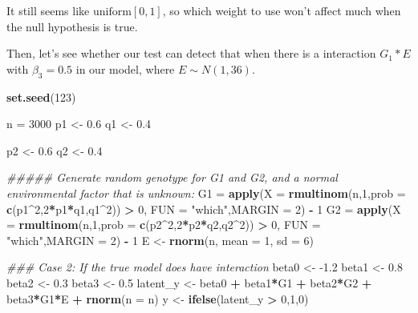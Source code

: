 \documentclass[]{article}
\newenvironment{Shaded}{\begin{snugshade}}{\end{snugshade}}
\newcommand{\CommentTok}[1]{\textcolor[rgb]{0.56,0.35,0.01}{\textit{#1}}}
\newcommand{\DataTypeTok}[1]{\textcolor[rgb]{0.13,0.29,0.53}{#1}}
\newcommand{\DecValTok}[1]{\textcolor[rgb]{0.00,0.00,0.81}{#1}}
\newcommand{\FloatTok}[1]{\textcolor[rgb]{0.00,0.00,0.81}{#1}}
\newcommand{\KeywordTok}[1]{\textcolor[rgb]{0.13,0.29,0.53}{\textbf{#1}}}
\newcommand{\NormalTok}[1]{#1}
\newcommand{\OperatorTok}[1]{\textcolor[rgb]{0.81,0.36,0.00}{\textbf{#1}}}
\newcommand{\StringTok}[1]{\textcolor[rgb]{0.31,0.60,0.02}{#1}}
\begin{document}
It still seems like \(\text{uniform}[0,1]\), so which weight to use
won't affect much when the null hypothesis is true.

Then, let's see whether our test can detect that when there is a
interaction \(G_1*E\) with \(\beta_3 = 0.5\) in our model, where
\(E \sim N(1,36)\).

\begin{Shaded}
\begin{Highlighting}[]
\KeywordTok{set.seed}\NormalTok{(}\DecValTok{123}\NormalTok{)}

\NormalTok{n =}\StringTok{ }\DecValTok{3000}
\NormalTok{p1 <-}\StringTok{ }\FloatTok{0.6}
\NormalTok{q1 <-}\StringTok{ }\FloatTok{0.4}

\NormalTok{p2 <-}\StringTok{ }\FloatTok{0.6}
\NormalTok{q2 <-}\StringTok{ }\FloatTok{0.4}


\CommentTok{##### Generate random genotype for G1 and G2, and a normal environmental factor that is unknown:}
\NormalTok{G1 =}\StringTok{ }\KeywordTok{apply}\NormalTok{(}\DataTypeTok{X =} \KeywordTok{rmultinom}\NormalTok{(n,}\DecValTok{1}\NormalTok{,}\DataTypeTok{prob =} \KeywordTok{c}\NormalTok{(p1}\OperatorTok{^}\DecValTok{2}\NormalTok{,}\DecValTok{2}\OperatorTok{*}\NormalTok{p1}\OperatorTok{*}\NormalTok{q1,q1}\OperatorTok{^}\DecValTok{2}\NormalTok{)) }\OperatorTok{>}\StringTok{ }\DecValTok{0}\NormalTok{, }\DataTypeTok{FUN =} \StringTok{"which"}\NormalTok{,}\DataTypeTok{MARGIN =} \DecValTok{2}\NormalTok{) }\OperatorTok{-}\StringTok{ }\DecValTok{1}
\NormalTok{G2 =}\StringTok{ }\KeywordTok{apply}\NormalTok{(}\DataTypeTok{X =} \KeywordTok{rmultinom}\NormalTok{(n,}\DecValTok{1}\NormalTok{,}\DataTypeTok{prob =} \KeywordTok{c}\NormalTok{(p2}\OperatorTok{^}\DecValTok{2}\NormalTok{,}\DecValTok{2}\OperatorTok{*}\NormalTok{p2}\OperatorTok{*}\NormalTok{q2,q2}\OperatorTok{^}\DecValTok{2}\NormalTok{)) }\OperatorTok{>}\StringTok{ }\DecValTok{0}\NormalTok{, }\DataTypeTok{FUN =} \StringTok{"which"}\NormalTok{,}\DataTypeTok{MARGIN =} \DecValTok{2}\NormalTok{) }\OperatorTok{-}\StringTok{ }\DecValTok{1}
\NormalTok{E <-}\StringTok{ }\KeywordTok{rnorm}\NormalTok{(n, }\DataTypeTok{mean =} \DecValTok{1}\NormalTok{, }\DataTypeTok{sd =} \DecValTok{6}\NormalTok{)}

\CommentTok{### Case 2: If the true model does have interaction}
\NormalTok{beta0 <-}\StringTok{ }\FloatTok{-1.2}
\NormalTok{beta1 <-}\StringTok{ }\FloatTok{0.8}
\NormalTok{beta2 <-}\StringTok{ }\FloatTok{0.3}
\NormalTok{beta3 <-}\StringTok{ }\FloatTok{0.5}
\NormalTok{latent_y <-}\StringTok{ }\NormalTok{beta0 }\OperatorTok{+}\StringTok{ }\NormalTok{beta1}\OperatorTok{*}\NormalTok{G1 }\OperatorTok{+}\StringTok{ }\NormalTok{beta2}\OperatorTok{*}\NormalTok{G2 }\OperatorTok{+}\StringTok{ }\NormalTok{beta3}\OperatorTok{*}\NormalTok{G1}\OperatorTok{*}\NormalTok{E }\OperatorTok{+}\StringTok{ }\KeywordTok{rnorm}\NormalTok{(}\DataTypeTok{n =}\NormalTok{ n)}
\NormalTok{y <-}\StringTok{ }\KeywordTok{ifelse}\NormalTok{(latent_y }\OperatorTok{>}\StringTok{ }\DecValTok{0}\NormalTok{,}\DecValTok{1}\NormalTok{,}\DecValTok{0}\NormalTok{)}


\end{Highlighting}
\end{Shaded}
\end{document}
